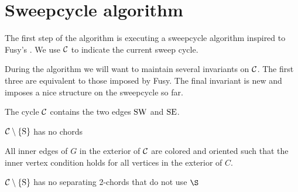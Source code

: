 
\section{Sweepcycle algorithm}
\thispagestyle{plain}
  \label{s:sweep}
  The first step of the algorithm is executing a sweepcycle algorithm inspired to Fusy's \cite{Fusy2006}. We use $\mathcal{C}$ to indicate the current sweep cycle.





  During the algorithm we will want to maintain several invariants on $\mathcal{C}$. The first three are equivalent to those imposed by Fusy. The final invariant is new and imposes a nice structure on the sweepcycle so far.


  \begin{invariants}
    \itemsep=-4pt

    \item \label{i:uni:SWandSE} The cycle $\mathcal{C}$ contains the two edges $\mathrm{S} \mathrm{W}$ and $\mathrm{S} \mathrm{E}$.
    \item \label{i:uni:noChords} $\mathcal{C} \setminus \left\lbrace {\mathrm{S}} \right\rbrace$ has no chords
    \item \label{i:uni:intVertCond} All inner edges of $G$ in the exterior of $\mathcal{C}$ are colored and oriented such that the inner vertex condition holds for all vertices in the exterior of $C$.
    \item \label{i:uni:no2Chords} $\mathcal{C}\setminus \left\lbrace {\mathrm{S}} \right\rbrace$ has no separating 2-chords that do not use $\S$
  \end{invariants}

